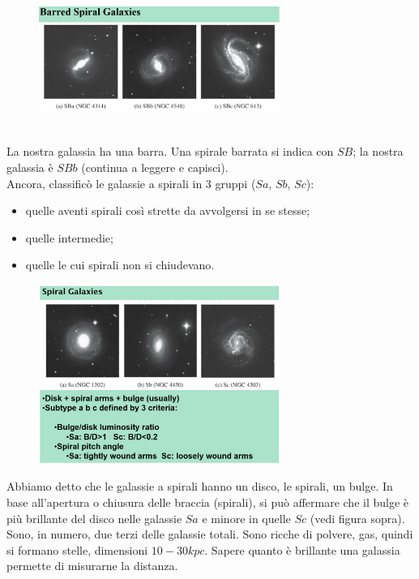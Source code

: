 \documentclass[a4paper,11pt]{article}
\begin{document}
\begin{figure} [h]
        \centering
        \includegraphics[width=0.7\textwidth]{immagini_lezioni12-12/galassie a spirali barrate.png}
        \label{}
    \end{figure}\\
 La nostra galassia ha una barra. Una spirale barrata si indica con $SB$; la nostra galassia è $SBb$ (continua a leggere e capisci).\\
Ancora, classificò le galassie a spirali in 3 gruppi ($Sa$, $Sb$, $Sc$):
\begin{itemize}
    \item quelle aventi spirali così strette da avvolgersi in se stesse;
    \item quelle intermedie;
    \item quelle le cui spirali non si chiudevano.
\end{itemize}
\begin{figure} [h]
        \centering
        \includegraphics[width=0.7\textwidth]{immagini_lezioni12-12/galassie a spirale sa sb sc.png}
        \label{}
    \end{figure}
\pagebreak
 Abbiamo detto che le galassie a spirali hanno un disco, le spirali, un bulge. In base all'apertura o chiusura delle braccia (spirali), si può affermare che il bulge è più brillante del disco nelle galassie $Sa$ e minore in quelle $Sc$ (vedi figura sopra). Sono, in numero, due terzi delle galassie totali. Sono ricche di polvere, gas, quindi si formano stelle, dimensioni $10-30 kpc$. Sapere quanto è brillante una galassia permette di misurarne la distanza. \\
\end{document}
